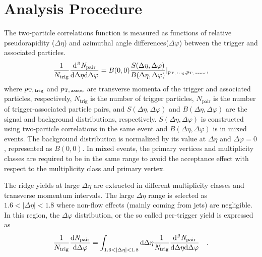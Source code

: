 \section{Analysis Procedure}
\label{sec:ana}

The two-particle correlations function is measured as functions of relative pseudorapidity ($\Delta\eta$) and azimuthal angle differences($\Delta\varphi$) between the trigger and associated particles.
\begin{eqnarray}
\frac{1}{N_{\rm{trig}}} \frac{ \rm{d}\it{}^{2} N_{\rm{pair}} }{ \rm{d} \Delta\eta \rm{d}\Delta\varphi} = B(0, 0)\frac{S(\Delta\eta, \Delta\varphi)}{B(\Delta\eta, \Delta\varphi)} \lvert_{p_\mathrm{T,\,trig},p_\mathrm{T,\,assoc}}  , 
\label{eq:corrfunction}
\end{eqnarray}
where  $p_\mathrm{T,\,trig}$ and $p_\mathrm{T,\,assoc}$ are transverse momenta of the trigger and associated particles, respectively, $N_\mathrm{trig}$ is the number of trigger particles, $N_\mathrm{pair}$ is the number of trigger-associated particle pairs, and $S (\Delta\eta, \Delta\varphi)$ and $B (\Delta\eta, \Delta\varphi)$ are the signal and background distributions, respectively. $S (\Delta\eta, \Delta\varphi)$ is constructed using two-particle correlations in the same event and $B(\Delta\eta, \Delta\varphi)$ is in mixed events. The background distribution is normalized by its value at $\Delta\eta$ and $\Delta\varphi = 0$, represented as $B (0,0)$. In mixed events, the primary vertices and multiplicity classes are required to be in the same range to avoid the acceptance effect with respect to the multiplicity class and primary vertex.

The ridge yields at large $\Delta\eta$ are extracted in different multiplicity classes and transverse momentum intervals. The large $\Delta\eta$ range is selected as $1.6<|\Delta\eta|<1.8$ where non-flow effects (mainly coming from jets) are negligible. In this region, the $\Delta\varphi$ distribution, or the so called per-trigger yield is expressed as
\begin{eqnarray}
\frac{1}{N_{\rm{trig}}} \frac{ \rm{d}\it{}N_{\rm{pair}} }{ \rm{d}\Delta\varphi } = \int_{1.6<|\Delta \eta|<1.8} \rm{d} \Delta \eta \frac{1}{\it{N}_{\rm{trig}}} \frac{ \rm{d}\it{}^{2} N_{\rm{pair}} }{ \rm{d}\Delta\eta d\Delta\varphi} \quad.
\end{eqnarray}

